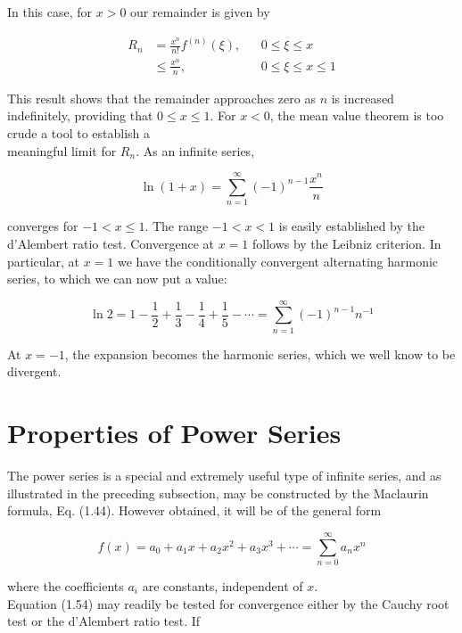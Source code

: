 \documentclass[10pt]{article}
\begin{document}
In this case, for $x>0$ our remainder is given by


\begin{align*}
R_{n} & =\frac{x^{n}}{n!} f^{(n)}(\xi), & & 0 \leq \xi \leq x \\
& \leq \frac{x^{n}}{n}, & & 0 \leq \xi \leq x \leq 1 \tag{1.51}
\end{align*}


This result shows that the remainder approaches zero as $n$ is increased indefinitely, providing that $0 \leq x \leq 1$. For $x<0$, the mean value theorem is too crude a tool to establish a\\
meaningful limit for $R_{n}$. As an infinite series,


\begin{equation*}
\ln (1+x)=\sum_{n=1}^{\infty}(-1)^{n-1} \frac{x^{n}}{n} \tag{1.52}
\end{equation*}


converges for $-1<x \leq 1$. The range $-1<x<1$ is easily established by the d'Alembert ratio test. Convergence at $x=1$ follows by the Leibniz criterion. In particular, at $x=1$ we have the conditionally convergent alternating harmonic series, to which we can now put a value:


\begin{equation*}
\ln 2=1-\frac{1}{2}+\frac{1}{3}-\frac{1}{4}+\frac{1}{5}-\cdots=\sum_{n=1}^{\infty}(-1)^{n-1} n^{-1} \tag{1.53}
\end{equation*}


At $x=-1$, the expansion becomes the harmonic series, which we well know to be divergent.

\section*{Properties of Power Series}
The power series is a special and extremely useful type of infinite series, and as illustrated in the preceding subsection, may be constructed by the Maclaurin formula, Eq. (1.44). However obtained, it will be of the general form


\begin{equation*}
f(x)=a_{0}+a_{1} x+a_{2} x^{2}+a_{3} x^{3}+\cdots=\sum_{n=0}^{\infty} a_{n} x^{n} \tag{1.54}
\end{equation*}


where the coefficients $a_{i}$ are constants, independent of $x$.\\
Equation (1.54) may readily be tested for convergence either by the Cauchy root test or the d'Alembert ratio test. If
\end{document}
